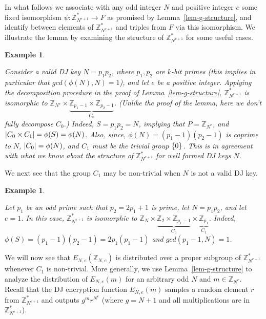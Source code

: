 \documentclass[11pt]{article}
\newtheorem{Example}[theorem]{Example}
\newenvironment{example}{\begin{Example}\begin{rm}}{\end{rm}\end{Example}}
\newcommand{\encdj}{{E}_{N,e}}
\newcommand{\Z}{\mathbb{Z}}
\newcommand{\U}[1]{\mathbb{Z}_{#1}^*}
\newcommand{\mathify}[1]{\ifmmode{#1}\else\mbox{$#1$}\fi}
\newcommand{\set}[2][]{\mathify{{\left\{#2\right\}}^{#1}}}
\newcommand{\size}[1]{\mathify{\left| #1 \right|}}
\begin{document}
In what follows we associate with any odd integer $N$ and positive
integer $e$ some fixed isomorphism $\psi:\U{N^{e+1}}\to F$ as
promised by Lemma~\ref{lem-g-structure}, and identify between
elements of $\U{N^{e+1}}$ and triples from $F$ via this
isomorphism. We illustrate the lemma by examining the structure of
$\U{N^{e+1}}$ for some useful cases.
\begin{example}
\label{ex-valid} Consider a valid DJ key $N=p_1p_2$, where
$p_1,p_2$ are $k$-bit primes (this implies in particular that
$gcd(\phi(N),N)=1$), and let $e$ be a positive integer. Applying
the decomposition procedure in the proof of
Lemma~\ref{lem-g-structure}, $\U{N^{e+1}}$ is isomorphic to
$\Z_{N^e}\times \underbrace{\Z_{p_1-1}\times\Z_{p_2-1}}_{C_0}$.
(Unlike the proof of the lemma, here we don't fully decompose
$C_0$.) Indeed, $S=p_1p_2=N$, implying that $P=\Z_{N^e}$, and
$\size{C_0\times C_1}=\phi(S)=\phi(N)$. Also, since,
$\phi(N)=(p_1-1)(p_2-1)$ is coprime to $N$, $\size{C_0}=\phi(N)$,
and $C_1$ must be the trivial group $\set{0}$. This is in agreement
with what we know about the structure of $\U{N^{e+1}}$ for well
formed DJ keys $N$.
\end{example}
We next see that the group $C_1$ may be non-trivial when $N$ is not
a valid DJ key.
\begin{example}
\label{ex-harmful} Let $p_1$ be an odd prime such that $p_2=2p_1+1$
is prime, let $N=p_1p_2$, and let $e=1$. In this case,
$\U{N^{e+1}}$ is isomorphic to
$\Z_N\times\underbrace{\Z_2\times\Z_{p_1-1}}_{C_0}\times
\underbrace{\Z_{p_1}}_{C_1}$. Indeed,
$\phi(S)=(p_1-1)(p_2-1)=2p_1(p_1-1)$ and $gcd(p_1-1,N)=1$.
\end{example}

We will now see that $\encdj(\Z_{N,e})$ is distributed over a
proper subgroup of $\U{N^{e+1}}$ whenever $C_1$ is non-trivial.
More generally, we use Lemma~\ref{lem-g-structure} to analyze the
distribution of $\encdj(m)$ for an arbitrary odd $N$ and
$m\in\Z_{N^e}$. Recall that the DJ encryption function $\encdj(m)$
samples a random element $r$ from ${\U{N^{e+1}}}$ and outputs
$g^mr^{N^e}$ (where $g=N+1$ and all multiplications are in
$\U{N^{e+1}}$).
\end{document}
